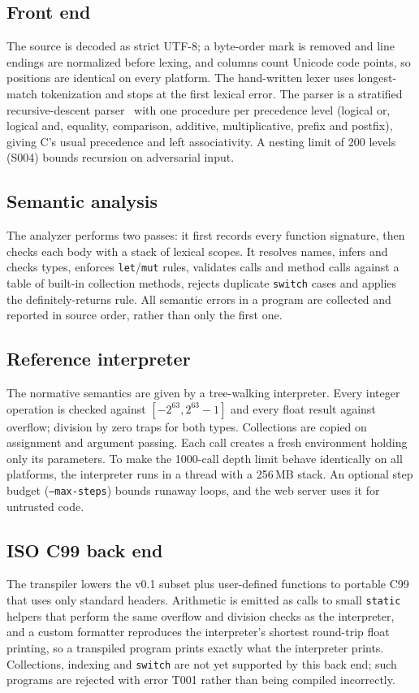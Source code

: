 \documentclass[conference]{IEEEtran}
\begin{document}
\subsection{Front end}
The source is decoded as strict UTF-8; a byte-order mark is removed and line endings are normalized before
lexing, and columns count Unicode code points, so positions are identical on every platform. The
hand-written lexer uses longest-match tokenization and stops at the first lexical error. The parser is a
stratified recursive-descent parser~\cite{dragonbook} with one procedure per precedence level (logical or,
logical and, equality, comparison, additive, multiplicative, prefix and postfix), giving C's usual
precedence and left associativity. A nesting limit of 200 levels (S004) bounds recursion on adversarial
input.

\subsection{Semantic analysis}
The analyzer performs two passes: it first records every function signature, then checks each body with a
stack of lexical scopes. It resolves names, infers and checks types, enforces \texttt{let}/\texttt{mut}
rules, validates calls and method calls against a table of built-in collection methods, rejects duplicate
\texttt{switch} cases and applies the definitely-returns rule. All semantic errors in a program are
collected and reported in source order, rather than only the first one.

\subsection{Reference interpreter}
The normative semantics are given by a tree-walking interpreter. Every integer operation is checked against
$[-2^{63}, 2^{63}-1]$ and every float result against overflow; division by zero traps for both types.
Collections are copied on assignment and argument passing. Each call creates a fresh environment holding only
its parameters. To make the 1000-call depth limit behave identically on all platforms, the interpreter runs
in a thread with a 256\,MB stack. An optional step budget (\texttt{--max-steps}) bounds runaway loops, and the
web server uses it for untrusted code.

\subsection{ISO C99 back end}
The transpiler lowers the v0.1 subset plus user-defined functions to portable C99 that uses only standard
headers. Arithmetic is emitted as calls to small \texttt{static} helpers that perform the same overflow and
division checks as the interpreter, and a custom formatter reproduces the interpreter's shortest
round-trip float printing, so a transpiled program prints exactly what the interpreter prints. Collections,
indexing and \texttt{switch} are not yet supported by this back end; such programs are rejected with error
T001 rather than being compiled incorrectly.
\end{document}
